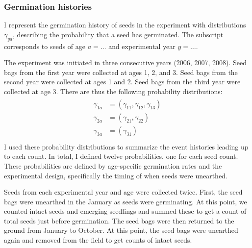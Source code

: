 \documentclass[12pt, oneside, titlepage]{article}   	%
\begin{document}
\subsubsection{Germination histories}

I represent the germination history of seeds in the experiment with distributions $\gamma_{ya}$, describing the probability that a seed has germinated. The subscript corresponds to seeds of age $a=\dots$ and experimental year $y=\dots$. 

The experiment was initiated in three consecutive years (2006, 2007, 2008). Seed bags from the first year were collected at ages 1, 2, and 3. Seed bags from the second year were collected at ages 1 and 2. Seed bags from the third year were collected at age 3. There are thus the following probability distributions:
%
\begin{align}
  \begin{split}
\gamma_{1a} & = (\gamma_{11}, \gamma_{12}, \gamma_{13}) \\
\gamma_{2a} & = (\gamma_{21}, \gamma_{22}) \\
\gamma_{3a} & = (\gamma_{31}) \\
  \end{split}
\end{align}
%
I used these probability distributions to summarize the event histories leading up to each count. In total, I defined twelve probabilities, one for each seed count. These probabilities are defined by age-specific germination rates and the experimental design, specifically the timing of when seeds were unearthed. 

Seeds from each experimental year and age were collected twice. First, the seed bags were unearthed in the January as seeds were germinating. At this point, we counted intact seeds and emerging seedlings and summed these to get a count of total seeds just before germination. The seed bags were then returned to the ground from January to October. At this point, the seed bags were unearthed again and removed from the field to get counts of intact seeds. 
\end{document}
